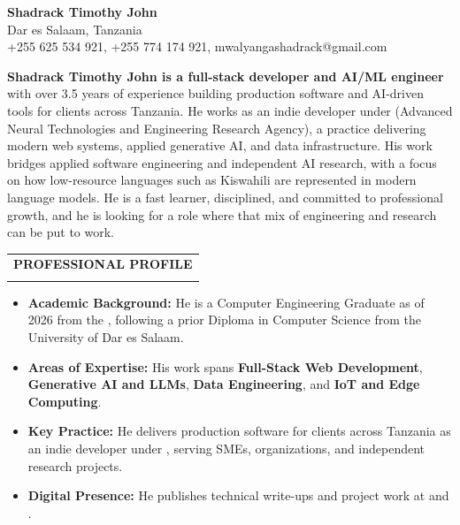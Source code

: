 \documentclass[12pt,a4paper]{article}
\makeatletter
\newcommand{\dottedsection}[1]{%
  \par\vspace{1.5em}%
  \noindent
  \begin{tabular}{@{}l@{}}
    {\large\textbf{\uppercase{#1}}} \\[-0.6em]
    \makebox[\widthof{\large\textbf{\uppercase{#1}}}]{\dotfill}
  \end{tabular}%
  \par\vspace{0.5em}%
}
\newcommand{\dotline}{\vspace{0.5em}\noindent\makebox[\linewidth]{\dotfill}\vspace{1em}}
\makeatother
\begin{document}
\noindent\colorbox{linkblue}{\makebox[\dimexpr\textwidth-2\fboxsep\relax]{\rule{0pt}{8pt}}}
\vspace{1em}

\begin{center}
    {\Huge\color{black}\textbf{Shadrack Timothy John}}\\[0.5em]
    {\small Dar es Salaam, Tanzania}\\
    {\small +255 625 534 921, +255 774 174 921, mwalyangashadrack@gmail.com}
\end{center}

\vspace{0.5em}
\dotline

\noindent \textbf{Shadrack Timothy John is a full-stack developer and AI/ML engineer} with over 3.5 years of experience building production software and AI-driven tools for clients across Tanzania. He works as an indie developer under  (Advanced Neural Technologies and Engineering Research Agency), a practice delivering modern web systems, applied generative AI, and data infrastructure. His work bridges applied software engineering and independent AI research, with a focus on how low-resource languages such as Kiswahili are represented in modern language models. He is a fast learner, disciplined, and committed to professional growth, and he is looking for a role where that mix of engineering and research can be put to work.

\vspace{1em}
\dotline

\dottedsection{Professional Profile}
\begin{itemize}[leftmargin=1.5em, itemsep=0pt, parsep=0pt, topsep=2pt]
    \item \textbf{Academic Background:} He is a Computer Engineering Graduate as of 2026 from the , following a prior Diploma in Computer Science from the University of Dar es Salaam.
    \item \textbf{Areas of Expertise:} His work spans \textbf{Full-Stack Web Development}, \textbf{Generative AI and LLMs}, \textbf{Data Engineering}, and \textbf{IoT and Edge Computing}.
    \item \textbf{Key Practice:} He delivers production software for clients across Tanzania as an indie developer under , serving SMEs, organizations, and independent research projects.
    \item \textbf{Digital Presence:} He publishes technical write-ups and project work at  and .
\end{itemize}
\end{document}
